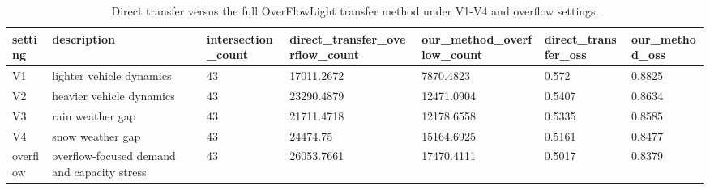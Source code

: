 \begin{table}[t]
\centering
\small
\begin{tabular}{lllllll}
\toprule
setting & description & intersection\_count & direct\_transfer\_overflow\_count & our\_method\_overflow\_count & direct\_transfer\_oss & our\_method\_oss \\
\midrule
V1 & lighter vehicle dynamics & 43 & 17011.2672 & 7870.4823 & 0.572 & 0.8825 \\
V2 & heavier vehicle dynamics & 43 & 23290.4879 & 12471.0904 & 0.5407 & 0.8634 \\
V3 & rain weather gap & 43 & 21711.4718 & 12178.6558 & 0.5335 & 0.8585 \\
V4 & snow weather gap & 43 & 24474.75 & 15164.6925 & 0.5161 & 0.8477 \\
overflow & overflow-focused demand and capacity stress & 43 & 26053.7661 & 17470.4111 & 0.5017 & 0.8379 \\
\bottomrule
\end{tabular}
\caption{Direct transfer versus the full OverFlowLight transfer method under V1-V4 and overflow settings.}
\label{tab:s2r-setting-transfer}
\end{table}
